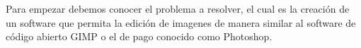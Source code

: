 Para empezar debemos conocer el problema a resolver, el cual es la creación de un
 software que permita la edición de imagenes de manera similar al software de código
  abierto GIMP o el de pago conocido como Photoshop.